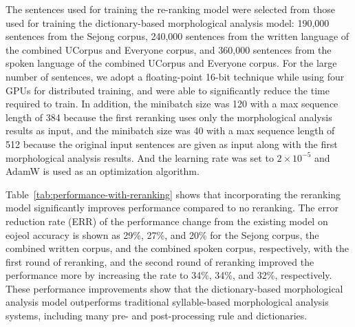 \documentclass[AMS,STIX2COL]{WileyNJD-v2}
\begin{document}
    The sentences used for training the re-ranking model were selected from those used for training the dictionary-based morphological analysis model: 190,000 sentences from the Sejong corpus, 240,000 sentences from the written language of the combined UCorpus and Everyone corpus, and 360,000 sentences from the spoken language of the combined UCorpus and Everyone corpus. For the large number of sentences, we adopt a floating-point 16-bit technique while using four GPUs for distributed training, and were able to significantly reduce the time required to train.
    In addition, the minibatch size was 120 with a max sequence length of 384 because the first reranking uses only the morphological analysis results as input, and the minibatch size was 40 with a max sequence length of 512 because the original input sentences are given as input along with the first morphological analysis results. And the learning rate was set to $2 \times 10^{-5}$ and AdamW is used as an optimization algorithm.

    Table~\ref{tab:performance-with-reranking} shows that incorporating the reranking model significantly improves performance compared to no reranking. The error reduction rate (ERR) of the performance change from the existing model on eojeol accuracy is shown as 29\%, 27\%, and 20\% for the Sejong corpus, the combined written corpus, and the combined spoken corpus, respectively, with the first round of reranking, and the second round of reranking improved the performance more by increasing the rate to 34\%, 34\%, and 32\%, respectively.
    These performance improvements show that the dictionary-based morphological analysis model outperforms traditional syllable-based morphological analysis systems, including many pre- and post-processing rule and dictionaries.
\end{document}
